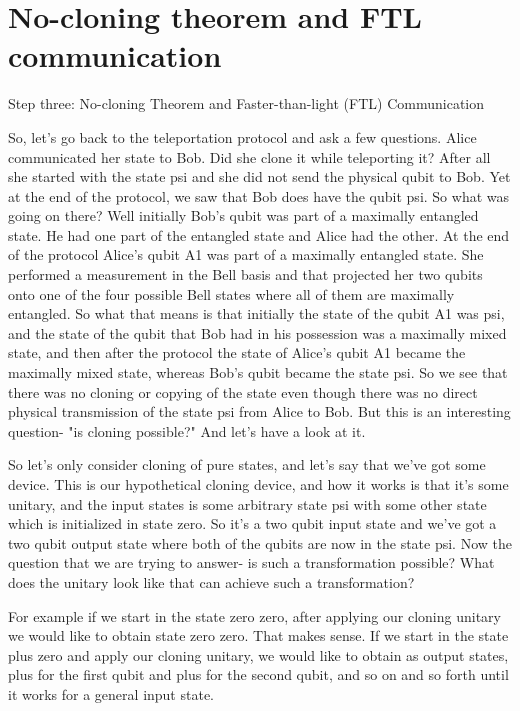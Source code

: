 \section{No-cloning theorem and FTL communication}

Step three: No-cloning Theorem and Faster-than-light (FTL) Communication

So, let's go back to the teleportation protocol and ask a few questions. Alice communicated her state to Bob. Did she clone it while teleporting it? After all she started with the state psi and she did not send the physical qubit to Bob. Yet at the end of the protocol, we saw that Bob does have the qubit psi. So what was going on there? Well initially Bob's qubit was part of a maximally entangled state. He had one part of the entangled state and Alice had the other. At the end of the protocol Alice's qubit A1 was part of a maximally entangled state. She performed a measurement in the Bell basis and that projected her two qubits onto one of the four possible Bell states where all of them are maximally entangled. So what that means is that initially the state of the qubit A1 was psi, and the state of the qubit that Bob had in his possession was a maximally mixed state, and then after the protocol the state of Alice's qubit A1 became the maximally mixed state, whereas Bob's qubit became the state psi. So we see that there was no cloning or copying of the state even though there was no direct physical transmission of the state psi from Alice to Bob. But this is an interesting question- "is cloning possible?" And let's have a look at it.

So let's only consider cloning of pure states, and let's say that we've got some device. This is our hypothetical cloning device, and how it works is that it's some unitary, and the input states is some arbitrary state psi with some other state which is initialized in state zero. So it's a two qubit input state and we've got a two qubit output state where both of the qubits are now in the state psi. Now the question that we are trying to answer- is such a transformation possible? What does the unitary look like that can achieve such a transformation?

For example if we start in the state zero zero, after applying our cloning unitary we would like to obtain state zero zero. That makes sense. If we start in the state plus zero and apply our cloning unitary, we would like to obtain as output states, plus for the first qubit and plus for the second qubit, and so on and so forth until it works for a general input state.

